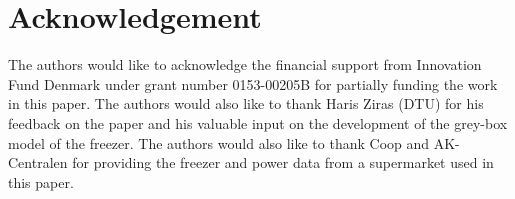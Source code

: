 \section*{Acknowledgement}

The authors would like to acknowledge the financial support from Innovation Fund Denmark under grant number 0153-00205B for partially funding the work in this paper. The authors would also like to thank Haris Ziras (DTU) for his feedback on the paper and his valuable input on the development of the grey-box model of the freezer. The authors would also like to thank Coop and AK-Centralen for providing the freezer and power data from a supermarket used in this paper.

